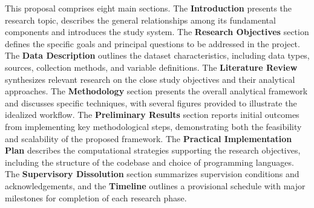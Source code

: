 \documentclass{article}
\begin{document}
This proposal comprises eight main sections. 
The \textbf{Introduction} presents the research topic, describes the general relationships among its fundamental components and 
introduces the study system. 
The \textbf{Research Objectives} section defines the specific goals and principal questions to be addressed in the project. 
The \textbf{Data Description} outlines the dataset characteristics, including data types, sources, collection methods, and variable definitions. 
The \textbf{Literature Review} synthesizes relevant research on the close study objectives and their analytical approaches.
The \textbf{Methodology} section presents the overall analytical framework and discusses specific techniques, with several figures provided 
to illustrate the idealized workflow. 
The \textbf{Preliminary Results} section reports initial outcomes from implementing key methodological steps, demonstrating both 
the feasibility and scalability of the proposed framework. 
The \textbf{Practical Implementation Plan} describes the computational strategies supporting the research objectives, including 
the structure of the codebase and choice of programming languages. 
The \textbf{Supervisory Dissolution} section summarizes supervision conditions and acknowledgements, 
and the \textbf{Timeline} outlines a provisional schedule with major milestones for completion of each research phase.  


\clearpage
\tableofcontents

\clearpage

\clearpage






\clearpage

\clearpage

\clearpage


\clearpage

\clearpage

\end{document}
